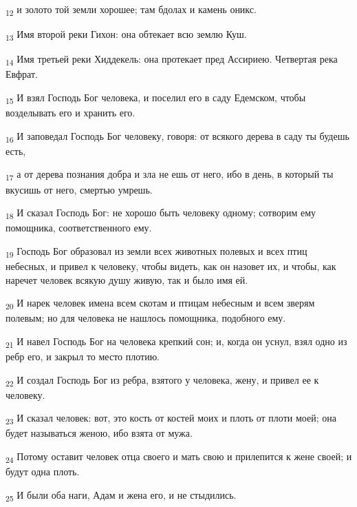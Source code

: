 \begin{tcolorbox}
\textsubscript{12} и золото той земли хорошее; там бдолах и камень оникс.
\end{tcolorbox}
\begin{tcolorbox}
\textsubscript{13} Имя второй реки Гихон: она обтекает всю землю Куш.
\end{tcolorbox}
\begin{tcolorbox}
\textsubscript{14} Имя третьей реки Хиддекель: она протекает пред Ассириею. Четвертая река Евфрат.
\end{tcolorbox}
\begin{tcolorbox}
\textsubscript{15} И взял Господь Бог человека, и поселил его в саду Едемском, чтобы возделывать его и хранить его.
\end{tcolorbox}
\begin{tcolorbox}
\textsubscript{16} И заповедал Господь Бог человеку, говоря: от всякого дерева в саду ты будешь есть,
\end{tcolorbox}
\begin{tcolorbox}
\textsubscript{17} а от дерева познания добра и зла не ешь от него, ибо в день, в который ты вкусишь от него, смертью умрешь.
\end{tcolorbox}
\begin{tcolorbox}
\textsubscript{18} И сказал Господь Бог: не хорошо быть человеку одному; сотворим ему помощника, соответственного ему.
\end{tcolorbox}
\begin{tcolorbox}
\textsubscript{19} Господь Бог образовал из земли всех животных полевых и всех птиц небесных, и привел к человеку, чтобы видеть, как он назовет их, и чтобы, как наречет человек всякую душу живую, так и было имя ей.
\end{tcolorbox}
\begin{tcolorbox}
\textsubscript{20} И нарек человек имена всем скотам и птицам небесным и всем зверям полевым; но для человека не нашлось помощника, подобного ему.
\end{tcolorbox}
\begin{tcolorbox}
\textsubscript{21} И навел Господь Бог на человека крепкий сон; и, когда он уснул, взял одно из ребр его, и закрыл то место плотию.
\end{tcolorbox}
\begin{tcolorbox}
\textsubscript{22} И создал Господь Бог из ребра, взятого у человека, жену, и привел ее к человеку.
\end{tcolorbox}
\begin{tcolorbox}
\textsubscript{23} И сказал человек: вот, это кость от костей моих и плоть от плоти моей; она будет называться женою, ибо взята от мужа.
\end{tcolorbox}
\begin{tcolorbox}
\textsubscript{24} Потому оставит человек отца своего и мать свою и прилепится к жене своей; и будут одна плоть.
\end{tcolorbox}
\begin{tcolorbox}
\textsubscript{25} И были оба наги, Адам и жена его, и не стыдились.
\end{tcolorbox}
